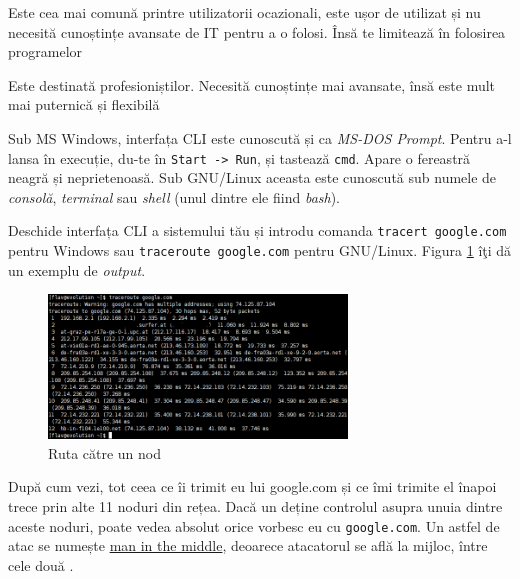 \begin{itemize}
	\begin{item} 
	\end{item}
	
	\begin{item}
	\end{item}
\end{itemize}
Sub MS Windows, interfața CLI este cunoscută și ca \textsl{MS-DOS Prompt}. Pentru
a-l lansa în execuție, du-te în \texttt{Start -> Run}, și tastează \texttt{cmd}.
Apare o fereastră neagră și neprietenoasă. Sub GNU/Linux aceasta este
cunoscută sub numele de \textsl{consolă}, \textsl{terminal} sau
\textsl{shell} (unul dintre ele fiind \textsl{bash}).

Deschide interfața CLI a sistemului tău și introdu comanda
\texttt{tracert google.com} pentru Windows sau \texttt{traceroute google.com} pentru 
GNU/Linux. Figura \ref{fig:cli traceroute} îţi dă un exemplu de \textsl{output}.

\begin{figure}[ht!]
  \centering
    \includegraphics[width=300px]{cap01/traceroute.png}
  \caption{Ruta către un nod}
  \label{fig:cli traceroute}
\end{figure}

După cum vezi, tot ceea ce îi trimit eu lui google.com și ce îmi trimite
el înapoi trece prin alte 11 noduri din rețea. Dacă un 
deține controlul asupra unuia dintre aceste noduri,
poate vedea absolut orice {\glqq}vorbesc{\grqq} eu cu \texttt{google.com}. Un astfel de atac
se numește \href{http://en.wikipedia.org/wiki/Man-in-the-middle_attack}{man in the middle},
deoarece atacatorul se află la mijloc, între
cele două .

